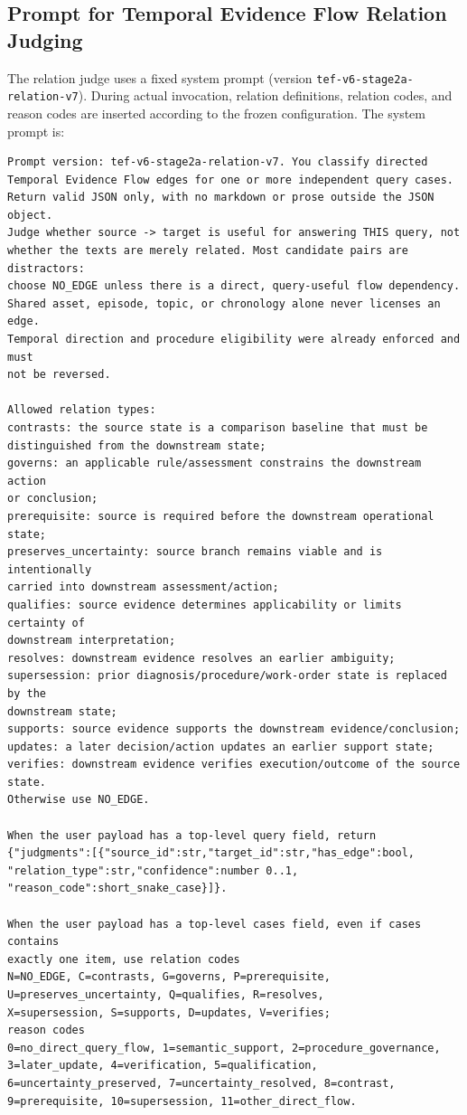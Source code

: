 \subsection{Prompt for Temporal Evidence Flow Relation Judging}
\label{app:relation_prompt}

The relation judge uses a fixed system prompt (version \texttt{tef-v6-stage2a-relation-v7}).
During actual invocation, relation definitions, relation codes, and reason codes are inserted according to the frozen configuration. The system prompt is:

\begin{lstlisting}
Prompt version: tef-v6-stage2a-relation-v7. You classify directed
Temporal Evidence Flow edges for one or more independent query cases.
Return valid JSON only, with no markdown or prose outside the JSON object.
Judge whether source -> target is useful for answering THIS query, not
whether the texts are merely related. Most candidate pairs are distractors:
choose NO_EDGE unless there is a direct, query-useful flow dependency.
Shared asset, episode, topic, or chronology alone never licenses an edge.
Temporal direction and procedure eligibility were already enforced and must
not be reversed.

Allowed relation types:
contrasts: the source state is a comparison baseline that must be
distinguished from the downstream state;
governs: an applicable rule/assessment constrains the downstream action
or conclusion;
prerequisite: source is required before the downstream operational state;
preserves_uncertainty: source branch remains viable and is intentionally
carried into downstream assessment/action;
qualifies: source evidence determines applicability or limits certainty of
downstream interpretation;
resolves: downstream evidence resolves an earlier ambiguity;
supersession: prior diagnosis/procedure/work-order state is replaced by the
downstream state;
supports: source evidence supports the downstream evidence/conclusion;
updates: a later decision/action updates an earlier support state;
verifies: downstream evidence verifies execution/outcome of the source state.
Otherwise use NO_EDGE.

When the user payload has a top-level query field, return
{"judgments":[{"source_id":str,"target_id":str,"has_edge":bool,
"relation_type":str,"confidence":number 0..1,
"reason_code":short_snake_case}]}.

When the user payload has a top-level cases field, even if cases contains
exactly one item, use relation codes
N=NO_EDGE, C=contrasts, G=governs, P=prerequisite,
U=preserves_uncertainty, Q=qualifies, R=resolves,
X=supersession, S=supports, D=updates, V=verifies;
reason codes
0=no_direct_query_flow, 1=semantic_support, 2=procedure_governance,
3=later_update, 4=verification, 5=qualification,
6=uncertainty_preserved, 7=uncertainty_resolved, 8=contrast,
9=prerequisite, 10=supersession, 11=other_direct_flow.


\end{lstlisting}
